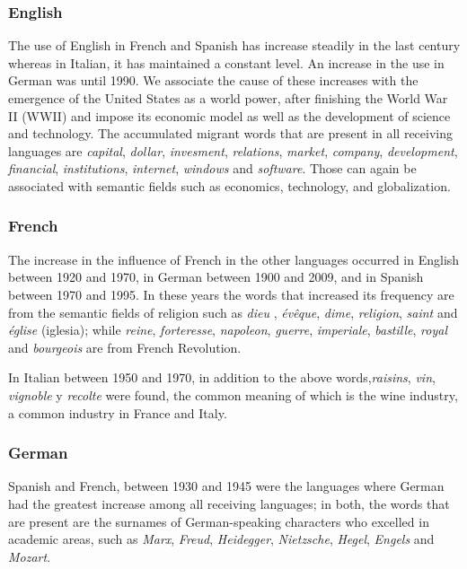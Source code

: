 \documentclass[10pt,letterpaper]{article} %
\begin{document}
\subsubsection*{English} %

The use of English in French and Spanish has increase steadily in the last century
whereas in Italian, it has maintained a constant level. 
An increase in the use  in German was until 1990. We associate the cause of these increases
with the emergence of the United States as a world power, after finishing the
World War II (WWII) and  impose its economic model as well as the development
of science and
technology. The accumulated migrant words that are present in all receiving
languages are \textit{capital}, \textit{dollar}, \textit{invesment},
\textit{relations}, \textit{market}, \textit{company}, \textit{development},
\textit{financial},  \textit{institutions}, \textit{internet}, \textit{windows}
and \textit{software}. Those can again be associated with semantic fields such
as economics, technology, and globalization.

\subsubsection*{French} %

The increase in the influence of French in the other languages occurred in
English between 1920 and 1970, in German between 1900 and 2009, and in Spanish
between 1970 and 1995. In these years the words that increased its frequency
are from the semantic fields of religion such as \textit{dieu} ,
\textit{évêque}, \textit{dime}, \textit{religion}, \textit{saint} and
\textit{église} (iglesia); while \textit{reine}, \textit{forteresse},
\textit{napoleon}, \textit{guerre}, \textit{imperiale}, \textit{bastille},
\textit{royal} and \textit{bourgeois} are from French Revolution.

In Italian between 1950 and 1970, in addition to the above
words,\textit{raisins}, \textit{vin}, \textit{vignoble} y \textit{recolte} were
found, the common meaning of which is the wine industry, a common industry in
France and Italy.

\subsubsection*{German} %

Spanish and French,  between 1930 and 1945 were the languages where German had the greatest
increase among all receiving languages; 
in both, the words that are present are the surnames of German-speaking
characters who excelled in academic areas, such as \textit{Marx},
\textit{Freud}, \textit{Heidegger}, \textit{Nietzsche}, \textit{Hegel},
\textit{Engels} and \textit{Mozart}.
\end{document}
